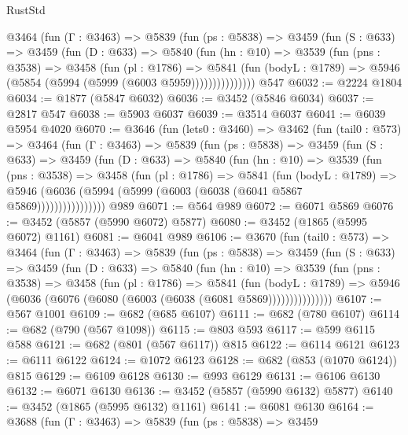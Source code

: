 \begin{lexlean}{RustStd}
\begin{coremodule}
        @3464
          (fun (Γ : @3463) =>
          @5839
            (fun (ps : @5838) =>
            @3459
              (fun (S : @633) =>
              @3459
                (fun (D : @633) =>
                @5840
                  (fun (hn : @10) =>
                  @3539
                    (fun (pns : @3538) =>
                    @3458
                      (fun (pl : @1786) =>
                      @5841
                        (fun (bodyL : @1789) =>
                        @5946 (@5854 (@5994 (@5999 (@6003 @5959)))))))))))))))
    @547
@6032 := @2224 @1804
@6034 := @1877 (@5847 @6032)
@6036 := @3452 (@5846 @6034)
@6037 := @2817 @547
@6038 := @5903 @6037
@6039 := @3514 @6037
@6041 := @6039 @5954 @4020
@6070 := @3646
    (fun (lets0 : @3460) =>
    @3462
      (fun (tail0 : @573) =>
      @3464
        (fun (Γ : @3463) =>
        @5839
          (fun (ps : @5838) =>
          @3459
            (fun (S : @633) =>
            @3459
              (fun (D : @633) =>
              @5840
                (fun (hn : @10) =>
                @3539
                  (fun (pns : @3538) =>
                  @3458
                    (fun (pl : @1786) =>
                    @5841
                      (fun (bodyL : @1789) =>
                      @5946 (@6036 (@5994 (@5999 (@6003 (@6038 (@6041 @5867 @5869))))))))))))))))
    @989
@6071 := @564 @989
@6072 := @6071 @5869
@6076 := @3452 (@5857 (@5990 @6072) @5877)
@6080 := @3452 (@1865 (@5995 @6072) @1161)
@6081 := @6041 @989
@6106 := @3670
    (fun (tail0 : @573) =>
    @3464
      (fun (Γ : @3463) =>
      @5839
        (fun (ps : @5838) =>
        @3459
          (fun (S : @633) =>
          @3459
            (fun (D : @633) =>
            @5840
              (fun (hn : @10) =>
              @3539
                (fun (pns : @3538) =>
                @3458
                  (fun (pl : @1786) =>
                  @5841
                    (fun (bodyL : @1789) =>
                    @5946 (@6036 (@6076 (@6080 (@6003 (@6038 (@6081 @5869)))))))))))))))
@6107 := @567 @1001
@6109 := @682 (@685 @6107)
@6111 := @682 (@780 @6107)
@6114 := @682 (@790 (@567 @1098))
@6115 := @803 @593
@6117 := @599 @6115 @588
@6121 := @682 (@801 (@567 @6117)) @815
@6122 := @6114 @6121
@6123 := @6111 @6122
@6124 := @1072 @6123
@6128 := @682 (@853 (@1070 @6124)) @815
@6129 := @6109 @6128
@6130 := @993 @6129
@6131 := @6106 @6130
@6132 := @6071 @6130
@6136 := @3452 (@5857 (@5990 @6132) @5877)
@6140 := @3452 (@1865 (@5995 @6132) @1161)
@6141 := @6081 @6130
@6164 := @3688
    (fun (Γ : @3463) =>
    @5839
      (fun (ps : @5838) =>
      @3459

\end{coremodule}
\end{lexlean}
